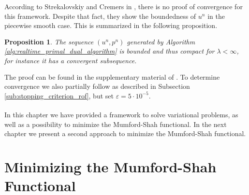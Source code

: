 \documentclass[abstracton]{scrreprt}
\newtheorem{proposition}[theorem]{Proposition}
\begin{document}
            According to Strekalovskiy and Cremers in \cite{Strekalovskiy-Cremers-eccv14}, there is no proof of convergence for this framework. Despite that fact, they show the boundedness of $u^{n}$ in the piecewise smooth case. This is summarized in the following proposition.
            \begin{proposition}
                The sequence $(u^{n}, p^{n})$ generated by Algorithm \ref{alg:realtime_primal_dual_algorithm} is bounded and thus compact for $\lambda < \infty$, for instance it has a convergent subsequence.
            \end{proposition}
            The proof can be found in the supplementary material of \cite{Strekalovskiy-Cremers-eccv14}. To determine convergence we also partially follow \cite{Strekalovskiy-Cremers-eccv14} as described in Subsection \ref{sub:stopping_criterion_rof}, but set $\varepsilon = 5 \cdot 10^{-5}$. \\\\
    In this chapter we have provided a framework to solve variational problems, as well as a possibility to minimize the Mumford-Shah functional. In the next chapter we present a second approach to minimize the Mumford-Shah functional.


\chapter{Minimizing the Mumford-Shah Functional} %
\label{cha:minimizing_the_mumford_shah_functional}
\end{document}
